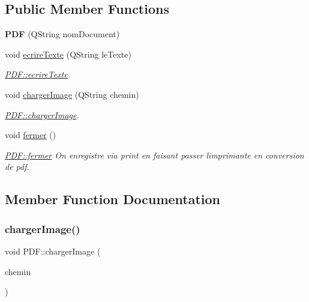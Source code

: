 \subsection*{Public Member Functions}
\begin{DoxyCompactItemize}
\item 
\mbox{\label{class_p_d_f_a67ddabfeb5a32f6fe6517778dc0f619c}} 
{\bfseries P\+DF} (Q\+String nom\+Document)
\item 
void \hyperlink{class_p_d_f_a7bb38923f4141702b3772ec41213917f}{ecrire\+Texte} (Q\+String le\+Texte)
\begin{DoxyCompactList}\small\item\em \hyperlink{class_p_d_f_a7bb38923f4141702b3772ec41213917f}{P\+D\+F\+::ecrire\+Texte}. \end{DoxyCompactList}\item 
void \hyperlink{class_p_d_f_a3c7d97ad7f3c7a390272d05c7f95e832}{charger\+Image} (Q\+String chemin)
\begin{DoxyCompactList}\small\item\em \hyperlink{class_p_d_f_a3c7d97ad7f3c7a390272d05c7f95e832}{P\+D\+F\+::charger\+Image}. \end{DoxyCompactList}\item 
\mbox{\label{class_p_d_f_a96a1cc767274d19eedec45ff7aca6b7a}} 
void \hyperlink{class_p_d_f_a96a1cc767274d19eedec45ff7aca6b7a}{fermer} ()
\begin{DoxyCompactList}\small\item\em \hyperlink{class_p_d_f_a96a1cc767274d19eedec45ff7aca6b7a}{P\+D\+F\+::fermer} On enregistre via print en faisant passer l\textquotesingle{}imprimante en conversion de pdf. \end{DoxyCompactList}\end{DoxyCompactItemize}


\subsection{Member Function Documentation}
\mbox{\label{class_p_d_f_a3c7d97ad7f3c7a390272d05c7f95e832}} 
\subsubsection{\texorpdfstring{charger\+Image()}{chargerImage()}}
{\footnotesize\ttfamily void P\+D\+F\+::charger\+Image (\begin{DoxyParamCaption}\item[{Q\+String}]{chemin }\end{DoxyParamCaption})}



